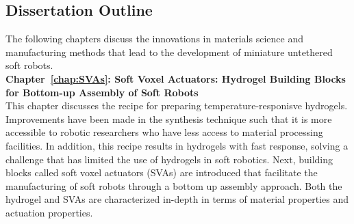 
\subsection{Dissertation Outline}
The following chapters discuss the innovations in materials science and manufacturing methods that lead to the development of miniature untethered soft robots.\\ 
\textbf{Chapter~\ref{chap:SVAs}: Soft Voxel Actuators: Hydrogel Building Blocks for Bottom-up Assembly of Soft Robots}\\
This chapter discusses the recipe for preparing temperature-responisve hydrogels. Improvements have been made in the synthesis technique such that it is more accessible to robotic researchers who have less access to material processing facilities. In addition, this recipe results in hydrogels with fast response, solving a challenge that has limited the use of hydrogels in soft robotics. Next, building blocks called soft voxel actuators (SVAs) are introduced that facilitate the manufacturing of soft robots through a bottom up assembly approach. Both the hydrogel and SVAs are characterized in-depth in terms of material properties and actuation properties.
  
